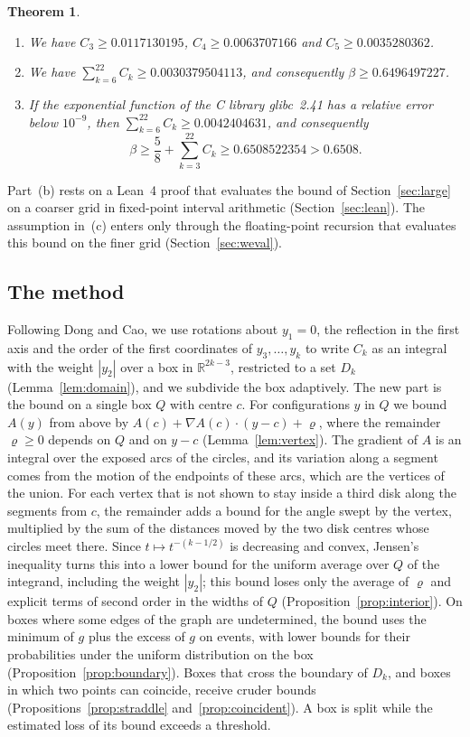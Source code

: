 \documentclass[11pt]{amsart}
\newtheorem{theorem}{Theorem}[section]
\theoremstyle{definition}
\theoremstyle{remark}
\numberwithin{equation}{section}
\newcommand{\R}{\mathbb{R}}
\newcommand{\CThree}{0.0117130195}
\newcommand{\CFour}{0.0063707166}
\newcommand{\CFive}{0.0035280362}
\newcommand{\WindowThree}{0.0042404631}%
\newcommand{\KmaxW}{22}
\newcommand{\LeanWbound}{0.6496497227}%
\newcommand{\LeanWThree}{0.0030379504113}%
\newcommand{\LBMAIN}{0.6508}
\newcommand{\SumBound}{0.6508522354}%
\newcommand{\Kmax}{\KmaxW}
\newcommand{\LargeSum}{\WindowThree}
\begin{document}
\begin{theorem}\label{thm:main}
\leavevmode
\begin{enumerate}[label=\textup{(\alph*)},leftmargin=*]
\item We have $C_3\ge\CThree$, $C_4\ge\CFour$ and $C_5\ge\CFive$.
\item We have $\sum_{k=6}^{\Kmax}C_k\ge\LeanWThree$, and consequently $\beta\ge\LeanWbound$.
\item If the exponential function of the C library glibc~2.41 has a relative error below $10^{-9}$, then $\sum_{k=6}^{\Kmax}C_k\ge\LargeSum$, and consequently
\[
\beta\ge\frac58+\sum_{k=3}^{\Kmax}C_k\ge\SumBound>\LBMAIN.
\]
\end{enumerate}
\end{theorem}

Part~(b) rests on a Lean~4 proof that evaluates the bound of Section~\ref{sec:large} on a coarser grid in fixed-point interval arithmetic (Section~\ref{sec:lean}). The assumption in~(c) enters only through the floating-point recursion that evaluates this bound on the finer grid (Section~\ref{sec:weval}).

\subsection*{The method}
Following Dong and Cao, we use rotations about $y_1=0$, the reflection in the first axis and the order of the first coordinates of $y_3,\dots,y_k$ to write $C_k$ as an integral with the weight $|y_2|$ over a box in $\R^{2k-3}$, restricted to a set $D_k$ (Lemma~\ref{lem:domain}), and we subdivide the box adaptively. The new part is the bound on a single box $Q$ with centre $c$. For configurations $y$ in $Q$ we bound $A(y)$ from above by $A(c)+\nabla A(c)\cdot(y-c)+\varrho$, where the remainder $\varrho\ge0$ depends on $Q$ and on $y-c$ (Lemma~\ref{lem:vertex}). The gradient of $A$ is an integral over the exposed arcs of the circles, and its variation along a segment comes from the motion of the endpoints of these arcs, which are the vertices of the union. For each vertex that is not shown to stay inside a third disk along the segments from $c$, the remainder adds a bound for the angle swept by the vertex, multiplied by the sum of the distances moved by the two disk centres whose circles meet there. Since $t\mapsto t^{-(k-1/2)}$ is decreasing and convex, Jensen's inequality turns this into a lower bound for the uniform average over $Q$ of the integrand, including the weight $|y_2|$; this bound loses only the average of $\varrho$ and explicit terms of second order in the widths of $Q$ (Proposition~\ref{prop:interior}). On boxes where some edges of the graph are undetermined, the bound uses the minimum of $g$ plus the excess of $g$ on events, with lower bounds for their probabilities under the uniform distribution on the box (Proposition~\ref{prop:boundary}). Boxes that cross the boundary of $D_k$, and boxes in which two points can coincide, receive cruder bounds (Propositions~\ref{prop:straddle} and~\ref{prop:coincident}). A box is split while the estimated loss of its bound exceeds a threshold.
\end{document}
